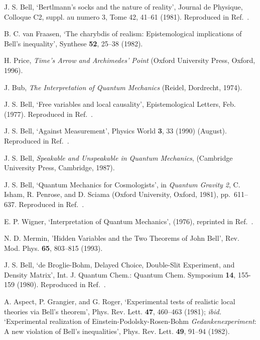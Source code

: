 \documentclass[12pt]{iopart}
\begin{document}
\begin{thebibliography}{10}
J. S. Bell, `Bertlmann's socks and the nature of reality', Journal
de Physique, Colloque C2, suppl. au numero 3, Tome 42, 41--61
(1981). Reproduced in Ref.~\cite{BellCollection}.

B. C. van Fraasen, `The charybdis of realism: Epistemological
implications of Bell's inequality', Synthese {\bf 52}, 25--38
(1982). 

H. Price, {\em Time's Arrow and Archimedes' Point} (Oxford
University Press, Oxford, 1996).

J. Bub, {\em The Interpretation of Quantum Mechanics} (Reidel,
Dordrecht, 1974).

J. S. Bell, `Free variables and local causality', Epistemological
Letters, Feb. (1977). Reproduced in Ref.~\cite{BellCollection}.

J. S. Bell, `Against Measurement', 
Physics World {\bf 3}, 33 (1990) (August). Reproduced in Ref.~\cite{BellCollection}.

J. S. Bell, {\em Speakable and Unspeakable in Quantum Mechanics},
(Cambridge University Press, Cambridge, 1987).

J. S. Bell, `Quantum Mechanics for Cosmologists', 
in {\em Quantum Gravity 2}, C. Isham, R. Penrose, and D. Sciama 
(Oxford University, Oxford, 1981), pp.~611--637.  Reproduced in Ref.~\cite{BellCollection}.

E. P. Wigner, `Interpretation of Quantum Mechanics',
(1976), reprinted in Ref.~\cite{WheZur83}.

N. D. Mermin, 
'Hidden Variables and the Two Theorems of John Bell', 
Rev. Mod. Phys. {\bf 65}, 803--815 (1993). 

J. S. Bell, 
`de Broglie-Bohm, Delayed Choice, Double-Slit Experiment, and Density Matrix', 
Int. J. Quantum Chem.: Quantum Chem. Symposium {\bf 14}, 155-159 (1980). 
Reproduced in Ref.~\cite{BellCollection}.

       A. Aspect, P. Grangier, and G. Roger,
       `Experimental tests of realistic local theories via Bell's theorem',
       Phys. Rev. Lett. {\bf 47}, 460--463 (1981); {\em ibid.}
       `Experimental realization of Einstein-Podolsky-Rosen-Bohm {\em Gedankenexperiment}:
       A new violation of Bell's inequalities', Phys. Rev. Lett.
       {\bf 49}, 91--94 (1982).


\end{thebibliography}
\end{document}
